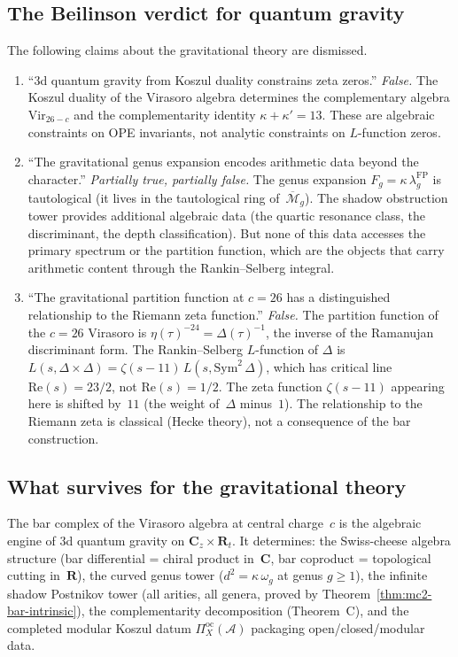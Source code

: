 \documentclass[11pt]{article}
\newcommand{\cA}{\mathcal{A}}
\newcommand{\cM}{\mathcal{M}}
\begin{document}
\subsection{The Beilinson verdict for quantum gravity}

The following claims about the gravitational theory are
dismissed.

\begin{enumerate}
\item ``3d quantum gravity from Koszul duality constrains zeta
zeros.''  \emph{False.}  The Koszul duality of the Virasoro
algebra determines the complementary algebra $\mathrm{Vir}_{26-c}$
and the complementarity identity $\kappa + \kappa' = 13$.
These are algebraic constraints on OPE invariants, not analytic
constraints on $L$-function zeros.

\item ``The gravitational genus expansion encodes arithmetic
data beyond the character.''  \emph{Partially true, partially
false.}  The genus expansion $F_g = \kappa\,
\lambda_g^{\mathrm{FP}}$ is tautological (it lives in the
tautological ring of~$\overline{\cM}_g$).  The shadow obstruction tower
provides additional algebraic data (the quartic resonance
class, the discriminant, the depth classification).  But none
of this data accesses the primary spectrum or the partition
function, which are the objects that carry arithmetic content
through the Rankin--Selberg integral.

\item ``The gravitational partition function at $c = 26$ has
a distinguished relationship to the Riemann zeta function.''
\emph{False.}  The partition function of the
$c = 26$ Virasoro is $\eta(\tau)^{-24} = \Delta(\tau)^{-1}$,
the inverse of the Ramanujan discriminant form.  The
Rankin--Selberg $L$-function of $\Delta$ is
$L(s, \Delta \times \Delta) = \zeta(s{-}11)\,
L(s, \mathrm{Sym}^2\, \Delta)$, which has critical line
$\mathrm{Re}(s) = 23/2$, not $\mathrm{Re}(s) = 1/2$.
The zeta function $\zeta(s{-}11)$ appearing here is shifted
by~$11$ (the weight of~$\Delta$ minus~$1$).  The relationship
to the Riemann zeta is classical (Hecke theory), not a
consequence of the bar construction.
\end{enumerate}

\subsection{What survives for the gravitational theory}

The bar complex of the Virasoro algebra at central charge~$c$
is the algebraic engine of $3$d quantum gravity on
$\mathbf{C}_z \times \mathbf{R}_t$.  It determines:
the Swiss-cheese algebra structure (bar differential = chiral
product in~$\mathbf{C}$, bar coproduct = topological cutting
in~$\mathbf{R}$), the curved genus tower ($d^2 = \kappa\,
\omega_g$ at genus $g \ge 1$), the infinite shadow Postnikov
tower (all arities, all genera, proved by
Theorem~\ref{thm:mc2-bar-intrinsic}), the complementarity
decomposition (Theorem~C), and the completed modular Koszul datum
$\Pi^{\mathrm{oc}}_X(\cA)$ packaging open/closed/modular data.
\end{document}

